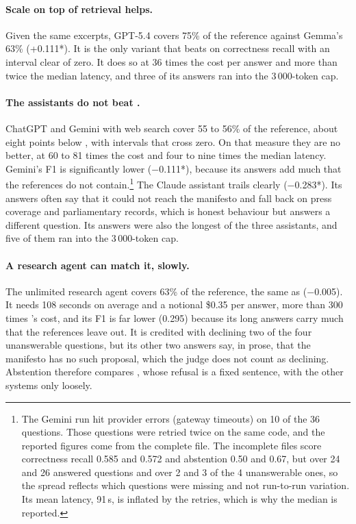 \paragraph{Scale on top of retrieval helps.} Given the same excerpts, GPT-5.4
covers 75\% of the reference against Gemma's 63\% (+0.111*). It is the only
variant that beats \sysname{} on correctness recall with an interval clear of
zero. It does so at 36 times the cost per answer and more than twice the
median latency, and three of its answers ran into the 3\,000-token cap.

\paragraph{The assistants do not beat \sysname{}.} ChatGPT and Gemini with web
search cover 55 to 56\% of the reference, about eight points below
\sysname{}, with intervals that cross zero. On that measure they are no better,
at 60 to 81 times the cost and four to nine times the median latency.
Gemini's F1 is significantly lower ($-$0.111*), because its answers add much
that the references do not contain.\footnote{The Gemini run hit provider
errors (gateway timeouts) on 10 of the 36 questions. Those questions
were retried twice on the same code, and the reported figures come from the
complete file. The incomplete files score correctness recall 0.585 and 0.572
and abstention 0.50 and 0.67, but over 24 and 26 answered questions and over
2 and 3 of the 4 unanswerable ones, so the spread reflects which questions
were missing and not run-to-run variation. Its mean latency, 91\,s, is
inflated by the retries, which is why the median is reported.} The Claude
assistant trails clearly ($-$0.283*). Its answers often say that it could not
reach the manifesto and fall back on press coverage and parliamentary
records, which is honest behaviour but answers a different question. Its
answers were also the longest of the three assistants, and five of them ran
into the 3\,000-token cap.

\paragraph{A research agent can match it, slowly.} The unlimited research
agent covers 63\% of the reference, the same as \sysname{} ($-$0.005). It needs
108 seconds on average and a notional \$0.35 per answer, more than 300 times
\sysname{}'s cost, and its F1 is far lower (0.295) because its long answers
carry much that the references leave out. It is credited with declining two of the four
unanswerable questions, but its other two answers say, in prose, that the
manifesto has no such proposal, which the judge does not count as declining.
Abstention therefore compares \sysname{}, whose refusal is a fixed sentence,
with the other systems only loosely.

